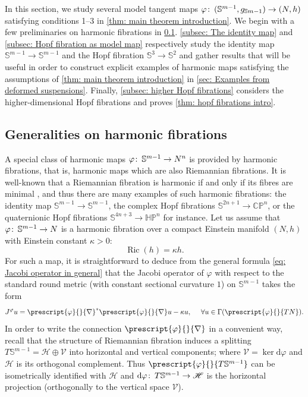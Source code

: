 \documentclass{article}
\numberwithin{equation}{section}        %
\theoremstyle{bfnote}
\theoremstyle{definition}
\theoremstyle{bfremark}
\newcommand{\col}{\colon \thinspace}        %
\newcommand{\C}{\mathbb{C}}                 %
\renewcommand{\P}{\mathbb{P}}               %
\newcommand{\Sp}{\mathbb{S}}                %
\newcommand{\diff}{\mathrm{d}}                      %
\DeclareMathOperator{\Ric}{Ric}                 %
\begin{document}
In this section, we study several model tangent maps $\varphi \col (\Sp^{m-1}, g_{\Sp{m-1}}) \to (N,h)$ satisfying conditions 1--3 in \cref{thm: main theorem introduction}. We begin with a few preliminaries on harmonic fibrations in \cref{subsec: harmonic fibrations}. \cref{subsec: The identity map} and \cref{subsec: Hopf fibration as model map} respectively study the identity map $\Sp^{m-1} \to \Sp^{m-1}$ and the Hopf fibration $\Sp^3 \to \Sp^2$ and gather results that will be useful in order to construct explicit examples of harmonic maps satisfying the assumptions of \cref{thm: main theorem introduction} in \cref{sec: Examples from deformed suspensions}. Finally, \cref{subsec: higher Hopf fibrations} considers the higher-dimensional Hopf fibrations and proves \cref{thm: hopf fibrations intro}.

    \subsection{Generalities on harmonic fibrations}        \label{subsec: harmonic fibrations}

A special class of harmonic maps $\varphi \col \Sp^{m-1} \rightarrow N^n$ is provided by harmonic fibrations, that is, harmonic maps which are also Riemannian fibrations. It is well-known that a Riemannian fibration is harmonic if and only if its fibres are minimal \cite{eells1964harmonic}, and thus there are many examples of such harmonic fibrations: the identity map $\Sp^{m-1} \to \Sp^{m-1}$, the complex Hopf fibrations $\Sp^{2n+1} \to \C\P^{n}$, or the quaternionic Hopf fibrations $\Sp^{4n+3} \to \mathbb{H}\P^{n}$ for instance. Let us assume that $\varphi \col \Sp^{m-1} \to N$ is a harmonic fibration over a compact Einstein manifold $(N,h)$ with Einstein constant $\kappa > 0$:
\begin{equation*}
    \Ric(h) = \kappa h .
\end{equation*}
For such a map, it is straightforward to deduce from the general formula \eqref{eq: Jacobi operator in general} that the Jacobi operator of $\varphi$ with respect to the standard round metric (with constant sectional curvature $1$) on $\Sp^{m-1}$ takes the form
\begin{equation}        \label{eq: Jacobi for fibration over Einstein manifold}
    J^\varphi u = \prescript{\varphi}{}{\nabla}^* \prescript{\varphi}{}{\nabla} u - \kappa u, ~~~~ \forall u \in \Gamma(\prescript{\varphi}{}{TN}) .
\end{equation}
In order to write the connection $\prescript{\varphi}{}{\nabla}$ in a convenient way, recall that the structure of Riemannian fibration induces a splitting $T\Sp^{m-1} = \mathscr H \oplus \mathscr V$ into horizontal and vertical components; where $\mathscr V = \ker \diff \varphi$ and $\mathscr H$ is its orthogonal complement. Thus $\prescript{\varphi}{}{T\Sp^{m-1}}$ can be isometrically identified with $\mathscr H$ and $\diff \varphi \col T\Sp^{m-1} \rightarrow \mathscr H$ is the horizontal projection (orthogonally to the vertical space $\mathscr V$). 
\end{document}
